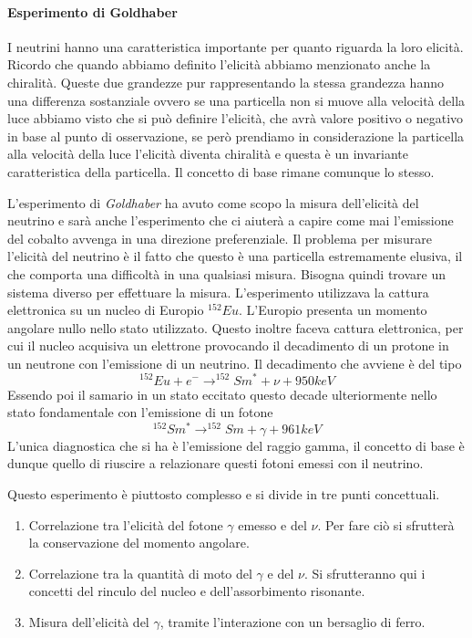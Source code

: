 \paragraph{Esperimento di Goldhaber}

I neutrini hanno una caratteristica importante per quanto riguarda la loro elicità.
Ricordo che quando abbiamo definito l'elicità abbiamo menzionato anche la chiralità.
Queste due grandezze pur rappresentando la stessa grandezza hanno una differenza sostanziale ovvero se una particella non si muove alla velocità della luce abbiamo visto che si può definire l'elicità, che avrà valore positivo o negativo in base al punto di osservazione, se però prendiamo in considerazione la particella alla velocità della luce l'elicità diventa chiralità e questa è un invariante caratteristica della particella.
Il concetto di base rimane comunque lo stesso.

L'esperimento di \emph{Goldhaber} ha avuto come scopo la misura dell'elicità del neutrino e sarà anche l'esperimento che ci aiuterà a capire come mai l'emissione del cobalto avvenga in una direzione preferenziale.
Il problema per misurare l'elicità del neutrino è il fatto che questo è una particella estremamente elusiva, il che comporta una difficoltà in una qualsiasi misura.
Bisogna quindi trovare un sistema diverso per effettuare la misura.
L'esperimento utilizzava la cattura elettronica su un nucleo di Europio $^{152}Eu$.
L'Europio presenta un momento angolare nullo nello stato utilizzato.
Questo inoltre faceva cattura elettronica, per cui il nucleo acquisiva un elettrone provocando il decadimento di un protone in un neutrone con l'emissione di un neutrino.
Il decadimento che avviene è del tipo
\begin{equation}
^{152}Eu+e^-\to ^{152}Sm^*+\nu +950keV
\end{equation}
Essendo poi il samario in un stato eccitato questo decade ulteriormente nello stato fondamentale con l'emissione di un fotone
\begin{equation}
^{152}Sm^*\to ^{152}Sm+\gamma+961keV
\end{equation}
L'unica diagnostica che si ha è l'emissione del raggio gamma, il concetto di base è dunque quello di riuscire a relazionare questi fotoni emessi con il neutrino.

Questo esperimento è piuttosto complesso e si divide in tre punti concettuali.
\begin{enumerate}
\item Correlazione tra l'elicità del fotone $\gamma$ emesso e del $\nu$.
Per fare ciò si sfrutterà la conservazione del momento angolare.
\item Correlazione tra la quantità di moto del $\gamma$ e del $\nu$.
Si sfrutteranno qui i concetti del rinculo del nucleo e dell'assorbimento risonante.
\item Misura dell'elicità del $\gamma$, tramite l'interazione con un bersaglio di ferro.
\end{enumerate}

